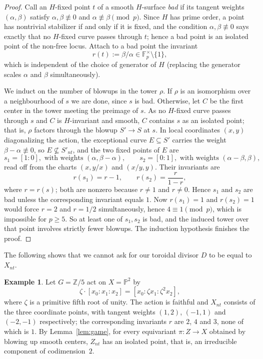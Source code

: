\documentclass[11pt]{amsart}
\theoremstyle{plain}
\theoremstyle{definition}
\newtheorem{example}[theorem]{Example}
\theoremstyle{remark}
\numberwithin{equation}{section}
\begin{document}
\begin{proof}
Call an $H$-fixed point $t$ of a smooth $H$-surface \emph{bad} if its
tangent weights $(\alpha,\beta)$ satisfy
$\alpha, \beta \not\equiv 0$ and $\alpha \not\equiv \beta \pmod p$.  Since
$H$ has prime order, a point has nontrivial stabilizer if and only if it
is fixed, and the condition $\alpha, \beta \not\equiv 0$ says exactly that
no $H$-fixed curve passes through $t$; hence a bad point is an isolated
point of the non-free locus.  Attach to a bad point the invariant
\[
r(t) := \beta/\alpha \in \mathbb{F}_p^\times \setminus \{1\},
\]
which is independent of the choice of generator of $H$ (replacing the
generator scales $\alpha$ and $\beta$ simultaneously).

We induct on the number of blowups in the tower $\rho$.  If $\rho$ is an
isomorphism over a neighbourhood of $s$ we are done, since $s$ is bad.
Otherwise, let $C$ be the first center in the tower meeting the preimage of
$s$.  As no $H$-fixed curve passes through $s$ and $C$ is $H$-invariant and
smooth, $C$ contains $s$ as an isolated point; that is, $\rho$ factors
through the blowup $S' \to S$ at $s$.  In local coordinates $(x,y)$
diagonalizing the action, the exceptional curve $E \subseteq S'$ carries the
weight $\beta - \alpha \not\equiv 0$, so $E \not\subseteq S'_{nt}$, and the
two fixed points of $E$ are
\[
s_1 = [1:0], \text{ with weights } (\alpha, \beta - \alpha),
\qquad
s_2 = [0:1], \text{ with weights } (\alpha - \beta, \beta) ,
\]
read off from the charts $(x, y/x)$ and $(x/y, y)$.  Their invariants are
\[
r(s_1) = r - 1 , \qquad r(s_2) = \frac{r}{1-r} ,
\]
where $r = r(s)$; both are nonzero because $r \neq 1$ and $r \neq 0$.  Hence
$s_1$ and $s_2$ are bad unless the corresponding invariant equals $1$.  Now
$r(s_1) = 1$ and $r(s_2) = 1$ would force $r = 2$ and $r = 1/2$
simultaneously, hence $4 \equiv 1 \pmod p$, which is impossible for
$p \geq 5$.  So at least one of $s_1, s_2$ is bad, and the induced tower over
that point involves strictly fewer blowups.  The induction hypothesis
finishes the proof.
\end{proof}

The following shows that we cannot ask for our toroidal divisor $D$ to
be equal to $X_{nt}$.

\begin{example} \label{ex:mu5}
Let $G = \mathbb{Z}/5$ act on $X = \mathbb{P}^2$ by
\[
\zeta \cdot [x_0 : x_1 : x_2] = [x_0 : \zeta x_1 : \zeta^2 x_2] ,
\]
where $\zeta$ is a primitive fifth root of unity.  The action is faithful and
$X_{nt}$ consists of the three coordinate points, with tangent weights
$(1,2)$, $(-1,1)$ and $(-2,-1)$ respectively; the corresponding invariants
$r$ are $2$, $4$ and $3$, none of which is $1$.  By Lemma~\ref{lem:game},
for every equivariant $\pi : Z \to X$ obtained by blowing up smooth centers,
$Z_{nt}$ has an isolated point, that is, an irreducible component of
codimension~$2$.
\end{example}




\end{document}
